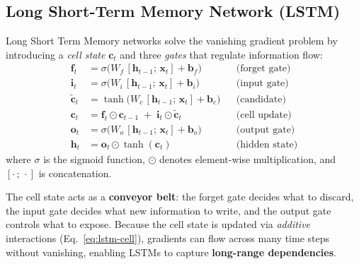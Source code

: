 \subsection*{Long Short-Term Memory Network (LSTM)}

Long Short Term Memory networks \cite{LSTM} solve the vanishing gradient problem by introducing a \emph{cell state} $\mathbf{c}_t$ and three \emph{gates} that regulate information flow:
\begin{align}
    \mathbf{f}_t &= \sigma\!\bigl(W_f\,[\mathbf{h}_{t-1};\,\mathbf{x}_t] + \mathbf{b}_f\bigr) & &\text{(forget gate)} \label{eq:lstm-forget}\\
    \mathbf{i}_t &= \sigma\!\bigl(W_i\,[\mathbf{h}_{t-1};\,\mathbf{x}_t] + \mathbf{b}_i\bigr) & &\text{(input gate)} \label{eq:lstm-input}\\
    \tilde{\mathbf{c}}_t &= \tanh\!\bigl(W_c\,[\mathbf{h}_{t-1};\,\mathbf{x}_t] + \mathbf{b}_c\bigr) & &\text{(candidate)} \\
    \mathbf{c}_t &= \mathbf{f}_t \odot \mathbf{c}_{t-1} \;+\; \mathbf{i}_t \odot \tilde{\mathbf{c}}_t & &\text{(cell update)} \label{eq:lstm-cell}\\
    \mathbf{o}_t &= \sigma\!\bigl(W_o\,[\mathbf{h}_{t-1};\,\mathbf{x}_t] + \mathbf{b}_o\bigr) & &\text{(output gate)} \\
    \mathbf{h}_t &= \mathbf{o}_t \odot \tanh(\mathbf{c}_t) & &\text{(hidden state)} \label{eq:lstm-hidden}
\end{align}
where $\sigma$ is the sigmoid function, $\odot$ denotes element-wise multiplication, and $[\cdot\,;\,\cdot]$ is concatenation.

The cell state acts as a \textbf{conveyor belt}: the forget gate decides what to discard, the input gate decides what new information to write, and the output gate controls what to expose.
Because the cell state is updated via \emph{additive} interactions (Eq.~\ref{eq:lstm-cell}), gradients can flow across many time steps without vanishing, enabling LSTMs to capture \textbf{long-range dependencies}.

